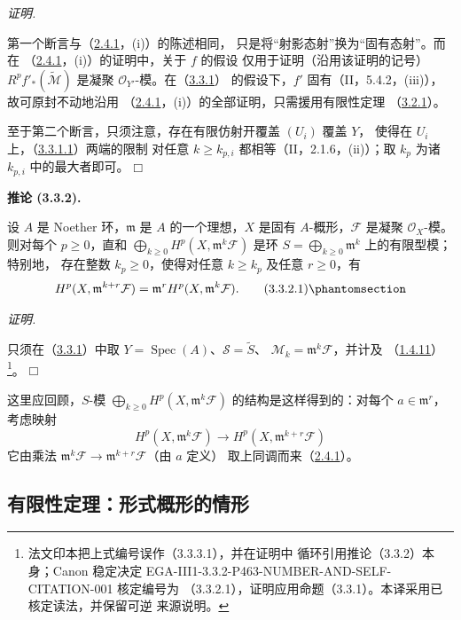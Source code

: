 \documentclass[UTF8,fontset=none,11pt,oneside,openany]{ctexbook}
\providecommand{\square}{\mdlgwhtsquare}
\newcommand{\SourceCorrectionNote}[1]{\footnote{#1}}
\newenvironment{corollary}[1][]{%
  \par\medskip\noindent\textbf{推论 (#1).}\ %
}{\par}
\newenvironment{proof}{%
  \par\smallskip\noindent\textit{证明.}\ %
}{\hfill$\square$\par}
\newcommand{\oldpage}[2][]{%
  \hypertarget{ega-source-page-#1-#2}{}%
  \marginnote{\scriptsize\textbf{#1}~|~#2}\ignorespaces}
\let\EGAOriginalLabel\label
\renewcommand{\label}[1]{\phantomsection\EGAOriginalLabel{#1}}
\begin{document}
\begin{proof}
第一个断言与（\hyperref[III.2.4.1-fr]{2.4.1}，(i)）的陈述相同，
只是将“射影态射”换为“固有态射”。而在
（\hyperref[III.2.4.1-fr]{2.4.1}，(i)）的证明中，关于 $f$ 的假设
仅用于证明（沿用该证明的记号）$R^pf'_*(\widetilde{\mathcal M})$
是凝聚 $\mathcal O_{Y'}$-模。在（\hyperref[III.3.3.1-fr]{3.3.1}）
的假设下，$f'$ 固有（II，5.4.2，(iii)），故可原封不动地沿用
（\hyperref[III.2.4.1-fr]{2.4.1}，(i)）的全部证明，只需援用有限性定理
（\hyperref[III.3.2.1-fr]{3.2.1}）。

至于第二个断言，只须注意，存在有限仿射开覆盖 $(U_i)$ 覆盖 $Y$，
使得在 $U_i$ 上，（\hyperref[III.3.3.1.1-fr]{3.3.1.1}）两端的限制
对任意 $k\geq k_{p,i}$ 都相等（II，2.1.6，(ii)）；取 $k_p$
为诸 $k_{p,i}$ 中的最大者即可。
\end{proof}

\begin{corollary}[3.3.2]
\label{III.3.3.2-fr}
设 $A$ 是 Noether 环，$\mathfrak m$ 是 $A$ 的一个理想，$X$ 是固有
$A$-概形，$\mathcal F$ 是凝聚 $\mathcal O_X$-模。则对每个
$p\geq0$，直和 $\bigoplus_{k\geq0}H^p(X,\mathfrak m^k\mathcal F)$
是环 $S=\bigoplus_{k\geq0}\mathfrak m^k$ 上的有限型模；特别地，
存在整数 $k_p\geq0$，使得对任意 $k\geq k_p$ 及任意 $r\geq0$，有
\[
H^p(X,\mathfrak m^{k+r}\mathcal F)
=\mathfrak m^rH^p(X,\mathfrak m^k\mathcal F).
\tag{3.3.2.1}\label{III.3.3.2.1-fr}
\]
\end{corollary}

\begin{proof}
只须在（\hyperref[III.3.3.1-fr]{3.3.1}）中取
$Y=\operatorname{Spec}(A)$、$\mathcal S=\widetilde S$、
$\mathcal M_k=\mathfrak m^k\mathcal F$，并计及
（\hyperref[III.1.4.11-fr]{1.4.11}）
\SourceCorrectionNote{法文印本把上式编号误作（3.3.3.1），并在证明中
循环引用推论（3.3.2）本身；Canon 稳定决定
EGA-III1-3.3.2-P463-NUMBER-AND-SELF-CITATION-001 核定编号为
（3.3.2.1），证明应用命题（3.3.1）。本译采用已核定读法，并保留可逆
来源说明。}。
\end{proof}

这里应回顾，$S$-模 $\bigoplus_{k\geq0}H^p(X,\mathfrak m^k\mathcal F)$
的结构是这样得到的：对每个 $a\in\mathfrak m^r$，考虑映射
\[
H^p(X,\mathfrak m^k\mathcal F)
\longrightarrow H^p(X,\mathfrak m^{k+r}\mathcal F)
\]
它由乘法
$\mathfrak m^k\mathcal F\to\mathfrak m^{k+r}\mathcal F$（由 $a$ 定义）
取上同调而来（\hyperref[III.2.4.1-fr]{2.4.1}）。

\oldpage[III]{119}
\subsection{有限性定理：形式概形的情形}
\label{subsection:III.3.4-fr}
\end{document}
